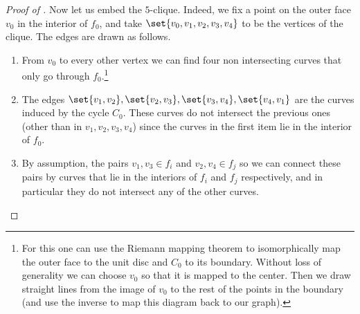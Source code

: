 \begin{proof}[Proof of ]
    Now let us embed the \(5\)-clique. Indeed, we fix a point on the outer face \(v_0\) in the interior of \(f_0\), and take \(\set{v_0,v_1,v_2,v_3,v_4}\) to be the vertices of the clique. The edges are drawn as follows.
    \begin{enumerate}
        \item From \(v_0\) to every other vertex we can find four non intersecting curves that only go through \(f_0\).\footnote{For this one can use the Riemann mapping theorem to isomorphically map the outer face to the unit disc and \(C_0\) to its boundary. Without loss of generality we can choose \(v_0\) so that it is mapped to the center. Then we draw straight lines from the image of \(v_0\) to the rest of the points in the boundary (and use the inverse to map this diagram back to our graph).}
        \item The edges \(\set{v_1,v_2},\set{v_2,v_3},\set{v_3,v_4},\set{v_4,v_1}\) are the curves induced by the cycle \(C_0\). These curves do not intersect the previous ones (other than in \(v_1,v_2,v_3,v_4\)) since the curves in the first item lie in the interior of \(f_0\).
        \item By assumption, the pairs \(v_1,v_3 \in f_i\) and \(v_2,v_4 \in f_j\) so we can connect these pairs by curves that lie in the interiors of \(f_i\) and \(f_j\) respectively, and in particular they do not intersect any of the other curves.
    \end{enumerate}
\end{proof}


    

